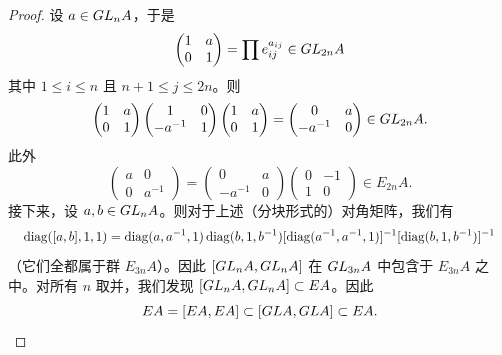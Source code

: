 \begin{proof}
设 $a\in GL_nA$，于是
\[
  \begin{pmatrix} 1 & a \\ 0 & 1 \end{pmatrix} = \prod e_{ij}^{a_{ij}} \in GL_{2n}A
\]
其中 $1\le i\le n$ 且 $n+1\le j\le 2n$。则
\[
  \begin{pmatrix} 1 & a \\ 0 & 1 \end{pmatrix}
  \begin{pmatrix} 1 & 0 \\ -a^{-1} & 1 \end{pmatrix}
  \begin{pmatrix} 1 & a \\ 0 & 1 \end{pmatrix}
  = \begin{pmatrix} 0 & a \\ -a^{-1} & 0 \end{pmatrix} \in GL_{2n}A.
\]
此外
\[
  \begin{pmatrix} a & 0 \\ 0 & a^{-1} \end{pmatrix}
  = \begin{pmatrix} 0 & a \\ -a^{-1} & 0 \end{pmatrix}
  \begin{pmatrix} 0 & -1 \\ 1 & 0 \end{pmatrix} \in E_{2n}A.
\]
接下来，设 $a,b\in GL_nA$。则对于上述（分块形式的）对角矩阵，我们有
\[
  \resizebox{0.98\textwidth}{!}{$\displaystyle
  \operatorname{diag}([a,b],1,1) = \operatorname{diag}(a,a^{-1},1)\operatorname{diag}(b,1,b^{-1})[\operatorname{diag}(a^{-1},a^{-1},1)]^{-1}[\operatorname{diag}(b,1,b^{-1})]^{-1}$}
\]
（它们全都属于群 $E_{3n}A$）。因此 $[GL_nA,GL_nA]$ 在 $GL_{3n}A$ 中包含于 $E_{3n}A$ 之中。对所有 $n$ 取并，我们发现 $[GL_nA,GL_nA]\subset EA$。因此
\[
  EA = [EA,EA] \subset [GL A,GL A] \subset EA.
\]
\end{proof}

